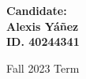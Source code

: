 \begin{titlepage}
\begin{spacing}{1.4}
\begin{minipage}[t]{0.5\textwidth}
\end{minipage}
\hfill
\begin{minipage}[t]{0.5\textwidth}\raggedleft
\bf Candidate:\\
Alexis Yáñez\\
ID. 40244341
\end{minipage}

\vfill

\begin{center}
\large Fall 2023 Term
\end{center}

\end{spacing}


\end{titlepage}
\restoregeometry

